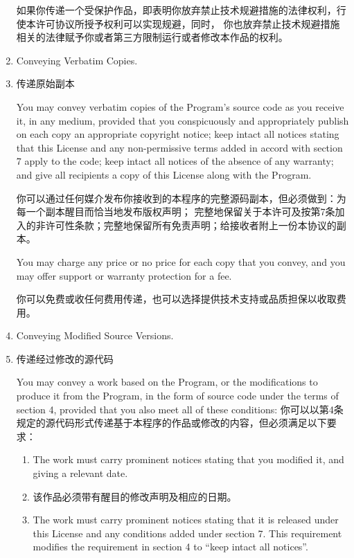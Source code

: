 \documentclass[11pt]{article}
\begin{document}
\begin{enumerate}
如果你传递一个受保护作品，即表明你放弃禁止技术规避措施的法律权利，行使本许可协议所授予权利可以实现规避，同时，
你也放弃禁止技术规避措施相关的法律赋予你或者第三方限制运行或者修改本作品的权利。

\item Conveying Verbatim Copies.
\item 传递原始副本

You may convey verbatim copies of the Program's source code as you
receive it, in any medium, provided that you conspicuously and
appropriately publish on each copy an appropriate copyright notice;
keep intact all notices stating that this License and any
non-permissive terms added in accord with section 7 apply to the code;
keep intact all notices of the absence of any warranty; and give all
recipients a copy of this License along with the Program.

你可以通过任何媒介发布你接收到的本程序的完整源码副本，但必须做到：为每一个副本醒目而恰当地发布版权声明；
完整地保留关于本许可及按第7条加入的非许可性条款；完整地保留所有免责声明；给接收者附上一份本协议的副本。


You may charge any price or no price for each copy that you convey,
and you may offer support or warranty protection for a fee.

你可以免费或收任何费用传递，也可以选择提供技术支持或品质担保以收取费用。

\item Conveying Modified Source Versions.
\item 传递经过修改的源代码

You may convey a work based on the Program, or the modifications to
produce it from the Program, in the form of source code under the
terms of section 4, provided that you also meet all of these conditions:
你可以以第4条规定的源代码形式传递基于本程序的作品或修改的内容，但必须满足以下要求：
  \begin{enumerate}
  \item The work must carry prominent notices stating that you modified
  it, and giving a relevant date.

  \item 该作品必须带有醒目的修改声明及相应的日期。

  \item The work must carry prominent notices stating that it is
  released under this License and any conditions added under section
  7.  This requirement modifies the requirement in section 4 to
  ``keep intact all notices''.


\end{enumerate}
\end{enumerate}
\end{document}
